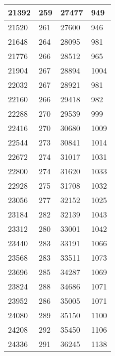 \begin{longtable}{|l|l|l|l|}
		21392 & 259         & 27477           & 949              \\ \hline
		21520 & 261         & 27600           & 946              \\ \hline
		21648 & 264         & 28095           & 981              \\ \hline
		21776 & 266         & 28512           & 965              \\ \hline
		21904 & 267         & 28894           & 1004             \\ \hline
		22032 & 267         & 28921           & 981              \\ \hline
		22160 & 266         & 29418           & 982              \\ \hline
		22288 & 270         & 29539           & 999              \\ \hline
		22416 & 270         & 30680           & 1009             \\ \hline
		22544 & 273         & 30841           & 1014             \\ \hline
		22672 & 274         & 31017           & 1031             \\ \hline
		22800 & 274         & 31620           & 1033             \\ \hline
		22928 & 275         & 31708           & 1032             \\ \hline
		23056 & 277         & 32152           & 1025             \\ \hline
		23184 & 282         & 32139           & 1043             \\ \hline
		23312 & 280         & 33001           & 1042             \\ \hline
		23440 & 283         & 33191           & 1066             \\ \hline
		23568 & 283         & 33511           & 1073             \\ \hline
		23696 & 285         & 34287           & 1069             \\ \hline
		23824 & 288         & 34686           & 1071             \\ \hline
		23952 & 286         & 35005           & 1071             \\ \hline
		24080 & 289         & 35150           & 1100             \\ \hline
		24208 & 292         & 35450           & 1106             \\ \hline
		24336 & 291         & 36245           & 1138             \\ \hline

\end{longtable}
